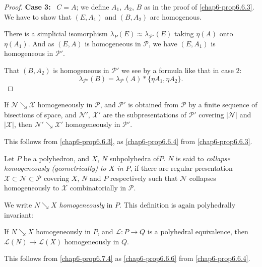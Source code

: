 \begin{proof}
\medskip
\noindent
{\bf Case 3:}~ $C=A$; we define $A_{1}$, $A_{2}$, $B$ as in the proof of \ref{chap6-prop6.6.3}. We have to show that $(E,A_{1})$ and $(B,A_{2})$ are homogenous.

There is a simplicial isomorphism $\lambda_{P}(E)\approx \lambda_{\mathscr{P}'}(E)$ taking $\eta(A)$ onto $\eta(A_{1})$. And as $(E,A)$ is homogeneous in $\mathscr{P}$, we have $(E,A_{1})$ is homogeneous in $\mathscr{P}'$.

That $(B,A_{2})$ is homogeneous in $\mathscr{P}'$ we see by a formula like that in case $2$:
$$
\lambda_{\mathscr{P}'}(B)=\lambda_{\mathscr{P}}(A)\ast \{\eta A_{1},\eta A_{2}\}.
$$
\end{proof}

\begin{proposition}\label{chap6-prop6.7.4}
If $\mathscr{N}\searrow \mathscr{X}$ homogeneously in $\mathscr{P}$, and $\mathscr{P}'$ is obtained from $\mathscr{P}$ by a finite sequence of bisections of space, and $\mathscr{N}'$, $\mathscr{X}'$ are the subpresentations of $\mathscr{P}'$ covering $|\mathscr{N}|$ and $|\mathscr{X}|$, then $\mathscr{N}'\searrow \mathscr{X}'$ homogeneously in $\mathscr{P}'$.

This follows from \ref{chap6-prop6.6.3}, as \ref{chap6-prop6.6.4} from \ref{chap6-prop6.6.3}. 
\end{proposition}

\begin{definition}\label{chap6-defi6.7.5}
Let $P$ be a polyhedron, and $X$, $N$ subpolyhedra of\pageoriginale $P$. $N$ is said to {\em collapse homogeneously (geometrically) to $X$ in $P$}, if there are regular presentation $\mathscr{X}\subset \mathscr{N}\subset \mathscr{P}$ covering $X$, $N$ and $P$ respectively such that $\mathscr{N}$ collapses homogeneously to $\mathscr{X}$ combinatorially in $\mathscr{P}$.

We write {\em $N\searrow X$ homogeneously} in $P$. This definition is again polyhedrally invariant:
\end{definition}

\begin{proposition}\label{chap6-prop6.7.6}
If $N\searrow X$ homogeneously in $P$, and $\mathcal{L}:P\to Q$ is a polyhedral equivalence, then $\mathcal{L}(N)\to \mathcal{L}(X)$ homogeneously in $Q$.

This follows from \ref{chap6-prop6.7.4} as \ref{chap6-prop6.6.6} from \ref{chap6-prop6.6.4}.
\end{proposition}

